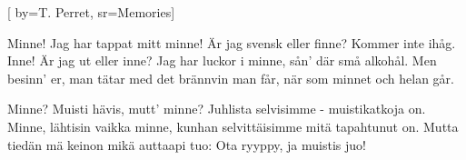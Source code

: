 [ 		
	by={T. Perret},					
	sr={Memories}]		
	
\beginverse*						
Minne! 
Jag har tappat mitt minne! 
Är jag svensk eller finne? 
Kommer inte ihåg.
Inne!
Är jag ut eller inne? 
Jag har luckor i minne, 
sån' där små alkohål. 
Men besinn' er, 
man tätar med det brännvin man får, 
när som minnet och helan går. 
\endverse						

\beginverse			
 Minne? Muisti hävis, mutt' minne?
Juhlista selvisimme
- muistikatkoja on.
Minne, lähtisin vaikka minne,
kunhan selvittäisimme
mitä tapahtunut on.
Mutta tiedän
mä keinon mikä auttaapi tuo:
Ota ryyppy, ja muistis juo!
\endverse				
\endsong		
